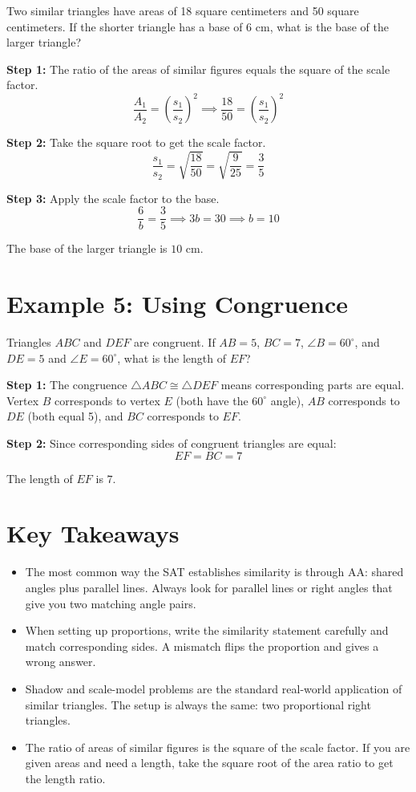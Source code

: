 \documentclass[14pt]{extarticle}
\begin{document}
Two similar triangles have areas of 18 square centimeters and 50 square centimeters. If the shorter triangle has a base of 6 cm, what is the base of the larger triangle?

\textbf{Step 1:} The ratio of the areas of similar figures equals the square of the scale factor.
\[
\frac{A_1}{A_2} = \left(\frac{s_1}{s_2}\right)^2 \implies \frac{18}{50} = \left(\frac{s_1}{s_2}\right)^2
\]

\textbf{Step 2:} Take the square root to get the scale factor.
\[
\frac{s_1}{s_2} = \sqrt{\frac{18}{50}} = \sqrt{\frac{9}{25}} = \frac{3}{5}
\]

\textbf{Step 3:} Apply the scale factor to the base.
\[
\frac{6}{b} = \frac{3}{5} \implies 3b = 30 \implies b = 10
\]

The base of the larger triangle is \(\boxed{10}\) cm.

\section*{Example 5: Using Congruence}

Triangles \(ABC\) and \(DEF\) are congruent. If \(AB = 5\), \(BC = 7\), \(\angle B = 60^\circ\), and \(DE = 5\) and \(\angle E = 60^\circ\), what is the length of \(EF\)?

\textbf{Step 1:} The congruence \(\triangle ABC \cong \triangle DEF\) means corresponding parts are equal. Vertex \(B\) corresponds to vertex \(E\) (both have the \(60^\circ\) angle), \(AB\) corresponds to \(DE\) (both equal 5), and \(BC\) corresponds to \(EF\).

\textbf{Step 2:} Since corresponding sides of congruent triangles are equal:
\[
EF = BC = 7
\]

The length of \(EF\) is \(\boxed{7}\).

\section*{Key Takeaways}
\begin{itemize}
  \item The most common way the SAT establishes similarity is through AA: shared angles plus parallel lines. Always look for parallel lines or right angles that give you two matching angle pairs.
  \item When setting up proportions, write the similarity statement carefully and match corresponding sides. A mismatch flips the proportion and gives a wrong answer.
  \item Shadow and scale-model problems are the standard real-world application of similar triangles. The setup is always the same: two proportional right triangles.
  \item The ratio of areas of similar figures is the square of the scale factor. If you are given areas and need a length, take the square root of the area ratio to get the length ratio.
\end{itemize}
\end{document}
